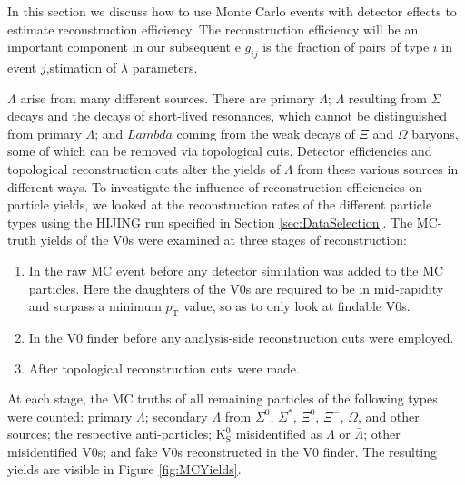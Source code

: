 In this section we discuss how to use Monte Carlo events with detector effects to estimate reconstruction efficiency.  
The reconstruction efficiency will be an important component in our subsequent e $g_{ij}$ is the fraction of pairs of type $i$ in event $j$,stimation of $\lambda$ parameters.

$\Lambda$ arise from many different sources.
There are primary $\Lambda$; $\Lambda$ resulting from $\Sigma$ decays and the decays of short-lived resonances, which cannot be distinguished from primary $\Lambda$; and $Lambda$ coming from the weak decays of $\Xi$ and $\Omega$ baryons, some of which can be removed via topological cuts.
Detector efficiencies and topological reconstruction cuts alter the yields of $\Lambda$ from these various sources in different ways.
To investigate the influence of reconstruction efficiencies on particle yields, we looked at the reconstruction rates of the different particle types using the HIJING run specified in Section \ref{sec:DataSelection}.  
The MC-truth yields of the V0s were examined at three stages of reconstruction:
\begin{enumerate}
\item In the raw MC event before any detector simulation was added to the MC particles.  
Here the daughters of the V0s are required to be in mid-rapidity and surpass a minimum $p_\mathrm{T}$ value, so as to only look at findable V0s.
\item In the V0 finder before any analysis-side reconstruction cuts were employed.
\item After topological reconstruction cuts were made.
\end{enumerate}
At each stage, the MC truths of all remaining particles of the following types were counted: primary $\Lambda$; secondary $\Lambda$ from $\Sigma^0$, $\Sigma^*$, $\Xi^0$, $\Xi^-$, $\Omega$, and other sources; the respective anti-particles; $\mathrm{K}^0_{\mathrm{S}}$ misidentified as $\Lambda$ or $\bar{\Lambda}$; other misidentified V0s; and fake V0s reconstructed in the V0 finder.  
The resulting yields are visible in Figure \ref{fig:MCYields}.

